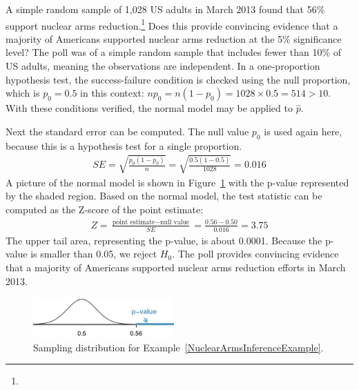\begin{example}{A simple random sample of 1,028 US adults in March 2013 found that 56\% support nuclear arms reduction.\footnote{} Does this provide convincing evidence that a majority of Americans supported nuclear arms reduction at the 5\% significance level?} \label{NuclearArmsInferenceExample}
The poll was of a simple random sample that includes fewer than 10\% of US adults, meaning the observations are independent. In a one-proportion hypothesis test, the success-failure condition is checked using the null proportion, which is $p_0 = 0.5$ in this context: $n p_0 = n (1 - p_0) = 1028 \times 0.5 = 514 > 10$. With these conditions verified, the normal model may be applied to $\hat{p}$.

Next the standard error can be computed. The null value $p_0$ is used again here, because this is a hypothesis test for a single proportion.
\begin{align*}
SE = \sqrt{\frac{p_0 (1 - p_0)}{n}} = \sqrt{\frac{0.5 (1 - 0.5)}{1028}} = 0.016
\end{align*}
A picture of the normal model is shown in Figure~\ref{nuclearArmsReductionPValue} with the p-value represented by the shaded region. Based on the normal model, the test statistic can be computed as the Z-score of the point estimate:
\begin{align*}
Z = \frac{\text{point estimate} - \text{null value}}{SE} = \frac{0.56 - 0.50}{0.016} = 3.75
\end{align*}
The upper tail area, representing the p-value, is about 0.0001. Because the p-value is smaller than 0.05, we reject $H_0$. The poll provides convincing evidence that a majority of Americans supported nuclear arms reduction efforts in March 2013.
\end{example}

\begin{figure}[h]
\centering
\includegraphics[width=0.48\textwidth]{ch_inference_for_props/figures/nuclearArmsReduction/nuclearArmsReductionPValue}
\caption{Sampling distribution for Example~\ref{NuclearArmsInferenceExample}.}
\label{nuclearArmsReductionPValue}
\end{figure}

